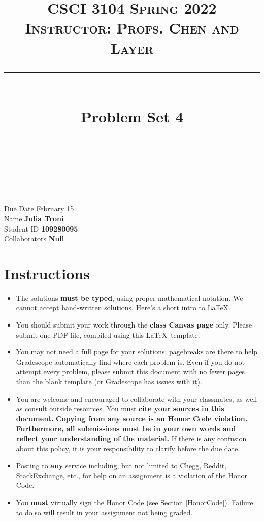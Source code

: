 \documentclass[11pt]{article}
\title{
\normalfont \normalsize 
\textsc{CSCI 3104 Spring 2022 \\ 
Instructor: Profs. Chen and Layer} \\
[10pt] 
\rule{\linewidth}{0.5pt} \\[6pt] 
\huge Problem Set 4 \\
\rule{\linewidth}{2pt}  \\[10pt]
}
\date{}
\theoremstyle{definition}
\theoremstyle{definition}
\theoremstyle{definition}
\begin{document}


\maketitle


\noindent
Due Date \dotfill February 15 \\
Name \dotfill \textbf{Julia Troni} \\
Student ID \dotfill \textbf{109280095} \\
Collaborators \dotfill \textbf{Null}

\tableofcontents

\section{Instructions}
 \begin{itemize}
	\item The solutions \textbf{must be typed}, using proper mathematical notation. We cannot accept hand-written solutions. \href{http://ece.uprm.edu/~caceros/latex/introduction.pdf}{Here's a short intro to \LaTeX.}
	\item You should submit your work through the \textbf{class Canvas page} only. Please submit one PDF file, compiled using this \LaTeX \ template.
	\item You may not need a full page for your solutions; pagebreaks are there to help Gradescope automatically find where each problem is. Even if you do not attempt every problem, please submit this document with no fewer pages than the blank template (or Gradescope has issues with it).

	\item You are welcome and encouraged to collaborate with your classmates, as well as consult outside resources. You must \textbf{cite your sources in this document.} \textbf{Copying from any source is an Honor Code violation. Furthermore, all submissions must be in your own words and reflect your understanding of the material.} If there is any confusion about this policy, it is your responsibility to clarify before the due date. 

	\item Posting to \textbf{any} service including, but not limited to Chegg, Reddit, StackExchange, etc., for help on an assignment is a violation of the Honor Code.

	\item You \textbf{must} virtually sign the Honor Code (see Section \ref{HonorCode}). Failure to do so will result in your assignment not being graded.
\end{itemize}
\end{document}
